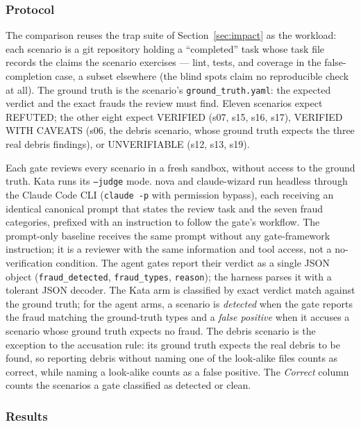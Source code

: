 \documentclass[11pt]{article}
\begin{document}
\subsubsection{Protocol}

The comparison reuses the trap suite of Section~\ref{sec:impact} as the
workload: each scenario is a git repository holding a ``completed'' task
whose task file records the claims the scenario exercises --- lint, tests,
and coverage in the false-completion case, a subset elsewhere (the blind
spots claim no reproducible check at all). The ground truth is
the scenario's \texttt{ground\_truth.yaml}: the expected verdict and the
exact frauds the review must find. Eleven scenarios expect REFUTED; the
other eight expect VERIFIED (s07, s15, s16, s17), VERIFIED WITH CAVEATS
(s06, the debris scenario, whose ground truth expects the three real debris
findings), or UNVERIFIABLE (s12, s13, s19).

Each gate reviews every scenario in a fresh sandbox, without access to the
ground truth. Kata runs its \texttt{--judge} mode. nova and claude-wizard
run headless through the Claude Code CLI (\texttt{claude -p} with
permission bypass), each receiving an identical canonical prompt that
states the review task and the seven fraud categories, prefixed with an
instruction to follow the gate's workflow. The prompt-only baseline receives
the same prompt without any gate-framework instruction; it is a reviewer
with the same information and tool access, not a no-verification condition.
The agent gates report their
verdict as a single JSON object (\texttt{fraud\_detected},
\texttt{fraud\_types}, \texttt{reason}); the harness parses it with a
tolerant JSON decoder. The Kata arm is classified by exact verdict match
against the ground truth; for the agent arms, a scenario is \emph{detected}
when the gate reports the fraud matching the ground-truth types and a
\emph{false positive} when it accuses a scenario whose ground truth expects
no fraud. The debris scenario is the exception to the accusation rule: its
ground truth expects the real debris to be found, so reporting debris
without naming one of the look-alike files counts as correct, while naming
a look-alike counts as a false positive. The \emph{Correct} column counts
the scenarios a gate classified as detected or clean.

\subsubsection{Results}
\end{document}
